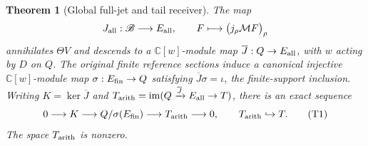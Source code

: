 \documentclass[11pt]{article}
\newtheorem{theorem}{Theorem}[section]
\newcommand{\C}{\mathbb C}\newcommand{\R}{\mathbb R}
\newcommand{\B}{\mathscr B}\newcommand{\M}{\mathcal M}
\begin{document}
\begin{theorem}[Global full-jet and tail receiver]\label{thm:global-tail}
The map
\[
 J_{\rm all}:\B\longrightarrow E_{\rm all},\qquad
 F\longmapsto\bigl(j_\rho\M F\bigr)_\rho
\]
annihilates $\Theta V$ and descends to a $\C[w]$-module map
$\overline J:Q\to E_{\rm all}$, with $w$ acting by $D$ on $Q$.
The original finite reference sections induce a canonical injective
$\C[w]$-module map $\sigma:E_{\rm fin}\to Q$ satisfying
$\overline J\sigma=\iota$, the finite-support inclusion.
Writing $K=\ker\overline J$ and
$T_{\rm arith}=\operatorname{im}(Q\xrightarrow{\overline J}
E_{\rm all}\to T)$, there is an exact sequence
\[
 0\longrightarrow K\longrightarrow Q/\sigma(E_{\rm fin})
       \longrightarrow T_{\rm arith}\longrightarrow0,
 \qquad T_{\rm arith}\hookrightarrow T.\tag{T1}
\]
The space $T_{\rm arith}$ is nonzero.
\end{theorem}
\end{document}
